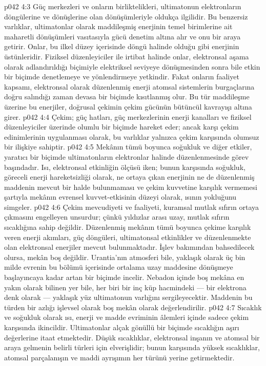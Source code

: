 \vs p042 4:3 Güç merkezleri ve onların birliktelikleri, ultimatonun elektronların döngülerine ve dönüşlerine olan dönüşümleriyle oldukça ilgilidir. Bu benzersiz varlıklar, ultimatonlar olarak maddileşmiş enerjinin temel birimlerine ait maharetli dönüşümleri vasıtasıyla gücü denetim altına alır ve onu bir araya getirir. Onlar, bu ilkel düzey içerisinde döngü halinde olduğu gibi enerjinin üstünleridir. Fiziksel düzenleyiciler ile irtibat halinde onlar, elektronsal aşama olarak adlandırıldığı biçimiyle elektriksel seviyeye dönüşmesinden sonra bile etkin bir biçimde denetlemeye ve yönlendirmeye yetkindir. Fakat onların faaliyet kapsamı, elektronsal olarak düzenlenmiş enerji atomsal sistemlerin burgaçlarına doğru salındığı zaman devasa bir biçimde kısıtlanmış olur. Bu tür maddileşme üzerine bu enerjiler, doğrusal çekimin çekim gücünün bütüncül kavrayışı altına girer.
\vs p042 4:4 Çekim; güç hatları, güç merkezlerinin enerji kanalları ve fiziksel düzenleyiciler üzerinde olumlu bir biçimde hareket eder; ancak karşı çekim edinimlerinin uygulanması olarak, bu varlıklar yalnızca çekim karşısında olumsuz bir ilişkiye sahiptir.
\vs p042 4:5 Mekânın tümü boyunca soğukluk ve diğer etkiler, yaratıcı bir biçimde ultimatonların elektronlar halinde düzenlenmesinde görev başındadır. Isı, elektronsal etkinliğin ölçüsü iken; bunun karşısında soğukluk, göreceli enerji hareketsizliği olarak, ne ortaya çıkan enerjinin ne de düzenlenmiş maddenin mevcut bir halde bulunmaması ve çekim kuvvetine karşılık vermemesi şartıyla mekânın evrensel kuvvet\hyp{}etkisinin düzeyi olarak, ısının yokluğunu simgeler.
\vs p042 4:6 Çekim mevcudiyeti ve faaliyeti, kuramsal mutlak sıfırın ortaya çıkmasını engelleyen unsurdur; çünkü yıldızlar arası uzay, mutlak sıfırın sıcaklığına sahip değildir. Düzenlenmiş mekânın tümü boyunca çekime karşılık veren enerji akımları, güç döngüleri, ultimatonsal etkinlikler ve düzenlenmekte olan elektronsal enerjiler mevcut bulunmaktadır. İşlev bakımından bahsedilecek olursa, mekân boş değildir. Urantia’nın atmosferi bile, yaklaşık olarak üç bin milde evrenin bu bölümü içerisinde ortalama uzay maddesine dönüşmeye başlayıncaya kadar artan bir biçimde incelir. Nebadon içinde boş mekâna en yakın olarak bilinen yer bile, her biri bir inç küp hacmindeki --- bir elektrona denk olarak --- yaklaşık yüz ultimatonun varlığını sergileyecektir. Maddenin bu türden bir azlığı işlevsel olarak boş mekân olarak değerlendirilir.
\vs p042 4:7 Sıcaklık ve soğukluk olarak ısı, enerji ve madde evriminin âlemleri içinde sadece çekim karşısında ikincildir. Ultimatonlar alçak gönüllü bir biçimde sıcaklığın aşırı değerlerine itaat etmektedir. Düşük sıcaklıklar, elektronsal inşanın ve atomsal bir araya gelmenin belirli türleri için elverişlidir; bunun karşısında yüksek sıcaklıklar, atomsal parçalanışın ve maddi ayrışımın her türünü yerine getirmektedir.
